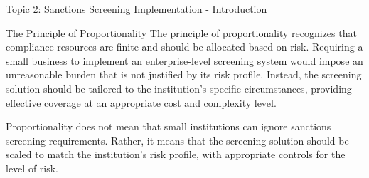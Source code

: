 \documentclass[8pt]{beamer}  %
\begin{document}
\begin{frame}{Topic 2: Sanctions Screening Implementation - Introduction}
\begin{block}{\large The Principle of Proportionality}
			The principle of proportionality recognizes that compliance resources are finite and should be allocated based on risk. Requiring a small business to implement an enterprise-level screening system would impose an unreasonable burden that is not justified by its risk profile. Instead, the screening solution should be tailored to the institution's specific circumstances, providing effective coverage at an appropriate cost and complexity level.
			
			Proportionality does not mean that small institutions can ignore sanctions screening requirements. Rather, it means that the screening solution should be scaled to match the institution's risk profile, with appropriate controls for the level of risk.
		\end{block}
	\end{frame}
	
\end{document}
